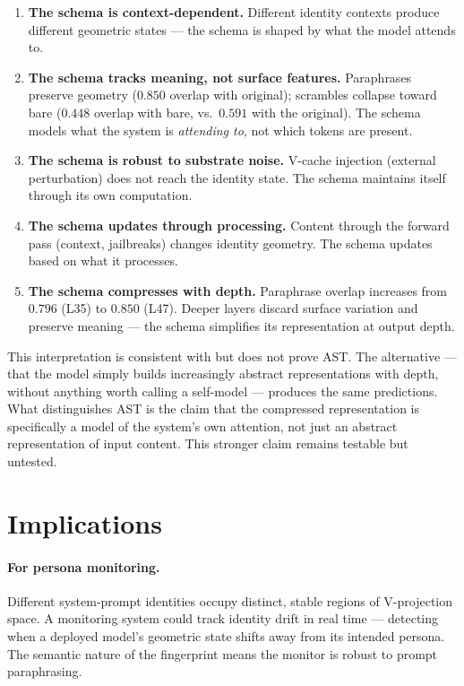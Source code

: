 \documentclass[11pt,a4paper]{article}
\begin{document}
\begin{enumerate}[nosep]
  \item \textbf{The schema is context-dependent.} Different identity
    contexts produce different geometric states --- the schema is shaped by
    what the model attends to.
  \item \textbf{The schema tracks meaning, not surface features.}
    Paraphrases preserve geometry ($0.850$ overlap with original);
    scrambles collapse toward bare ($0.448$ overlap with bare, vs.\
    $0.591$ with the original). The schema models what the system is
    \emph{attending to}, not which tokens are present.
  \item \textbf{The schema is robust to substrate noise.} V-cache injection
    (external perturbation) does not reach the identity state. The schema
    maintains itself through its own computation.
  \item \textbf{The schema updates through processing.} Content through
    the forward pass (context, jailbreaks) changes identity geometry.
    The schema updates based on what it processes.
  \item \textbf{The schema compresses with depth.} Paraphrase overlap
    increases from $0.796$ (L35) to $0.850$ (L47). Deeper layers discard
    surface variation and preserve meaning --- the schema simplifies its
    representation at output depth.
\end{enumerate}

This interpretation is consistent with but does not prove AST. The
alternative --- that the model simply builds increasingly abstract
representations with depth, without anything worth calling a self-model
--- produces the same predictions. What distinguishes AST is the claim
that the compressed representation is specifically a model of the
system's own attention, not just an abstract representation of input
content. This stronger claim remains testable but untested.

\section{Implications}
\label{sec:implications}

\paragraph{For persona monitoring.}
Different system-prompt identities occupy distinct, stable regions of
V-projection space. A monitoring system could track identity drift in
real time --- detecting when a deployed model's geometric state shifts
away from its intended persona. The semantic nature of the fingerprint
means the monitor is robust to prompt paraphrasing.
\end{document}
